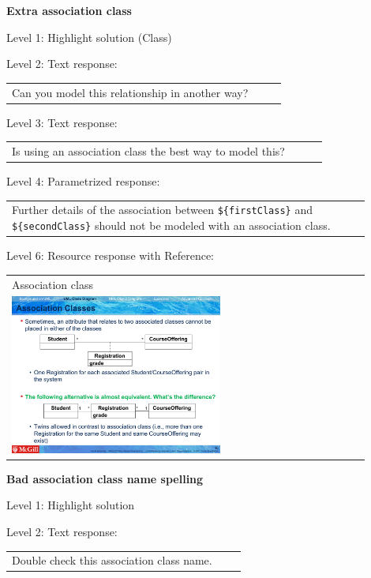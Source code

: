 \noindent \textbf{Extra association class} \medskip

\noindent Level 1: Highlight solution (Class) \medskip

\noindent Level 2: Text response: \medskip

\begin{tabular}{|p{0.9\linewidth}}
Can you model this relationship in another way?
\end{tabular} \medskip

\noindent Level 3: Text response: \medskip

\begin{tabular}{|p{0.9\linewidth}}
Is using an association class the best way to model this?
\end{tabular} \medskip

\noindent Level 4: Parametrized response: \medskip

\begin{tabular}{|p{0.9\linewidth}}
Further details of the association between \verb|${firstClass}| and \verb|${secondClass}| should not be modeled with an association class.
\end{tabular} \medskip

\noindent Level 6: Resource response with Reference: \medskip

\begin{tabular}{|p{0.9\linewidth}}
Association class

\\
\includegraphics[width=0.6\textwidth]{images/association_class.png}
\end{tabular} \medskip


\noindent \textbf{Bad association class name spelling} \medskip

\noindent Level 1: Highlight solution  \medskip

\noindent Level 2: Text response: \medskip

\begin{tabular}{|p{0.9\linewidth}}
Double check this association class name.
\end{tabular} \medskip

